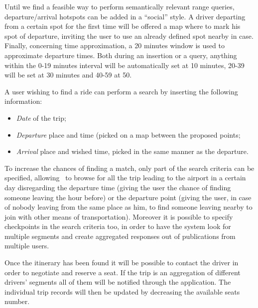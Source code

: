 Until we find a feasible way to perform semantically relevant range
queries, departure/arrival hotspots can be added in a ``social''
style. A driver departing from a certain spot for the first time will
be offered a map where to mark his spot of departure, inviting the
user to use an already defined spot nearby in case. Finally,
concerning time approximation, a 20 minutes window is used to
approximate departure times. Both during an insertion or a query,
anything within the 0-19 minutes interval will be automatically set at
10 minutes, 20-39 will be set at 30 minutes and 40-59 at 50.

%
A user wishing to find a ride can perform a search by inserting the
following information:
%
\begin{itemize}
\item \emph{Date} of the trip;
\item \emph{Departure} place and time (picked on a map between the
  proposed points;
\item \emph{Arrival} place and wished time, picked in the same
  manner as the departure.
\end{itemize}
%
To increase the chances of finding a match, only part of the search
criteria can be specified, allowing \eg\ to browse for all the trip
leading to the airport in a certain day disregarding the departure
time (giving the user the chance of finding someone leaving the hour
before) or the departure point (giving the user, in case of nobody
leaving from the same place as him, to find someone leaving nearby to
join with other means of transportation).  Moreover it is possible to
specify checkpoints in the search criteria too, in order to have the
system look for multiple segments and create aggregated responses out
of publications from multiple users.

%
Once the itinerary has been found it will be possible to contact the
driver in order to negotiate and reserve a seat. If the trip is an
aggregation of different drivers' segments all of them will be
notified through the application. The individual trip records will
then be updated by decreasing the available seats number.

